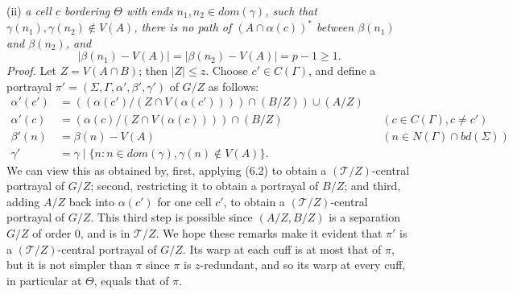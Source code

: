 \hspace*{12pt}(ii) \textit{a cell $c$ bordering $\Theta$ with ends $n_1, n_2 \in dom(\gamma)$, such that $\gamma(n_1), \gamma(n_2) \notin V(A)$, there is no path of $(A \cap \alpha(c))^*$ between $\beta(n_1)$ and $\beta(n_2)$, and}
\begin{equation*}
|\beta(n_1) - V(A)| = |\beta(n_2) - V(A)| = p - 1 \ge 1.
\end{equation*}
\textit{Proof.} Let $Z = V(A \cap B)$; then $|Z| \le z$. Choose $c' \in C(\Gamma)$, and define a portrayal $\pi' = (\Sigma, \Gamma, \alpha', \beta', \gamma')$ of $G/Z$ as follows:
\begin{align*}
\alpha'(c') &= ((\alpha(c')/(Z \cap V(\alpha(c')))) \cap (B/Z)) \cup (A/Z) \\
\alpha'(c) &= (\alpha(c)/(Z \cap V(\alpha(c)))) \cap (B/Z) && (c \in C(\Gamma), c \ne c') \\
\beta'(n) &= \beta(n) - V(A) && (n \in N(\Gamma) \cap bd(\Sigma)) \\
\gamma' &= \gamma \mid \{n : n \in dom(\gamma), \gamma(n) \notin V(A)\}.
\end{align*}
We can view this as obtained by, first, applying (6.2) to obtain a $(\mathscr{T}/Z)$-central portrayal of $G/Z$; second, restricting it to obtain a portrayal of $B/Z$; and third, adding $A/Z$ back into $\alpha(c')$ for one cell $c'$, to obtain a $(\mathscr{T}/Z)$-central portrayal of $G/Z$. This third step is possible since $(A/Z, B/Z)$ is a separation $G/Z$ of order 0, and is in $\mathscr{T}/Z$. We hope these remarks make it evident that $\pi'$ is a $(\mathscr{T}/Z)$-central portrayal of $G/Z$. Its warp at each cuff is at most that of $\pi$, but it is not simpler than $\pi$ since $\pi$ is $z$-redundant, and so its warp at every cuff, in particular at $\Theta$, equals that of $\pi$.
